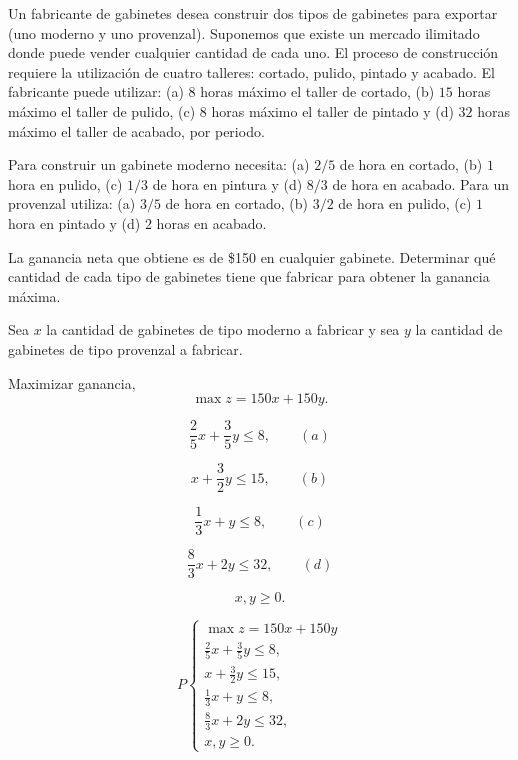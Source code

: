 \begin{Ejem} Un fabricante de gabinetes desea construir dos tipos de gabinetes para exportar (uno moderno y uno provenzal). Suponemos que existe un mercado ilimitado donde puede vender cualquier cantidad de cada uno. El proceso de construcci\'on requiere la utilizaci\'on de cuatro talleres: cortado, pulido, pintado y acabado. El fabricante puede utilizar: (a) $8$ horas m\'aximo el taller de cortado, (b) $15$ horas m\'aximo el taller de pulido, (c) $8$ horas m\'aximo el taller de pintado y (d) $32$ horas m\'aximo el taller de acabado, por periodo.

Para construir un gabinete moderno necesita: (a) $2/5$ de hora en cortado, (b) $1$ hora en pulido, (c) $1/3$ de hora en pintura y (d) $8/3$ de hora en acabado. Para un provenzal utiliza: (a) $3/5$ de hora en cortado, (b) $3/2$ de hora en pulido, (c) $1$ hora en pintado y (d) $2$ horas en acabado.

La ganancia neta que obtiene es de \$150 en cualquier gabinete. Determinar qu\'e cantidad de cada tipo de gabinetes tiene que fabricar para obtener la ganancia m\'axima.

\begin{tcolorbox}[title=Variables de decisi\'on.] Sea $x$ la cantidad de gabinetes de tipo moderno a fabricar y sea $y$ la cantidad de gabinetes de tipo provenzal a fabricar.
\end{tcolorbox}

\begin{tcolorbox}[title=Funci\'on objetivo.] Maximizar ganancia,
\[
\max z = 150x + 150y.
\]
\end{tcolorbox}

\begin{tcolorbox}[title=Restricciones.]
\[
\frac{2}{5}x + \frac{3}{5}y \le 8, \qquad (a)
\]

\[
x + \frac{3}{2}y \le 15, \qquad (b)
\]

\[
\frac{1}{3}x + y \le 8, \qquad (c)
\]

\[
\frac{8}{3}x + 2y \le 32, \qquad (d)
\]

\[
x,y \ge 0.
\]
\end{tcolorbox}

\begin{tcolorbox}[title= El problema queda planteado como]

\[
P
\begin{cases}
\max z = 150x + 150y\\
\frac{2}{5}x + \frac{3}{5}y \le 8,\\
x + \frac{3}{2}y \le 15,\\
\frac{1}{3}x + y \le 8,\\
\frac{8}{3}x + 2y \le 32,\\
x,y \ge 0.
\end{cases}
\]
\end{tcolorbox}

\end{Ejem}

